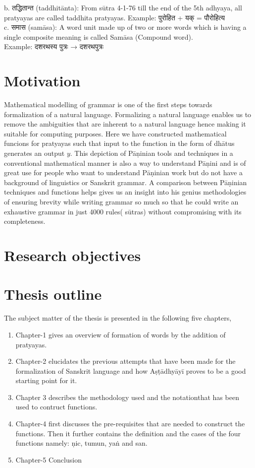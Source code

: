b.	\texthindi{तद्धितान्त} (taddhitānta): From sūtra 4-1-76 till the end of the 5th adhyaya, all pratyayas are called taddhita pratyayas.
Example: \texthindi{पुरोहित} + \texthindi{यक्} = \texthindi{पौरोहित्य}\\
c.	\texthindi{समास} (samāsa): A word unit made up of two or more words which is having a single composite meaning is called Samāsa (Compound word). \\
Example: \texthindi{दशरथस्य पुत्रः → दशरथपुत्रः}



\section{Motivation}
Mathematical modelling of grammar is one of the first steps towards formalization of a natural language. Formalizing a natural language enables us to remove the ambiguities that are inherent to a natural language hence making it suitable for computing purposes. Here we have constructed mathematical funcions for pratyayas such that input to the function in the form of dhātus generates an output $y$. This depiction of Pāṇinian tools and techniques in a conventional mathematical manner is also a way to understand Pāṇini and is of great use for people who want to understand Pāṇinian work but do not have a background of linguistics or Sanskrit grammar. A comparison between Pāṇinian techniques and functions helps gives us an insight into his genius methodologies of ensuring brevity while writing grammar so much so that he could write an exhaustive grammar in just 4000 rules( sūtras) without compromising with its completeness.



\section{Research objectives}

\section{Thesis outline}
The subject matter of the thesis is presented in the following five chapters, 
\begin{enumerate}[label=\checkmark]
	\item	Chapter-1 gives an overview of formation of words by the addition of pratyayas. 
	\item	Chapter-2 elucidates the previous attempts that have been made for the formalization of Sanskrit language and how Aṣṭādhyāyī proves to be a good starting point for it. 
	\item	Chapter 3 describes the methodology used and the notationthat has been used to contruct functions.
	\item Chapter-4 first discusses the pre-requisites that are needed to construct the functions. Then it further contains the definition and the cases of the four functions namely: ṇic, tumun, yaṅ and san.  
	\item	Chapter-5 Conclusion  

\end{enumerate}

